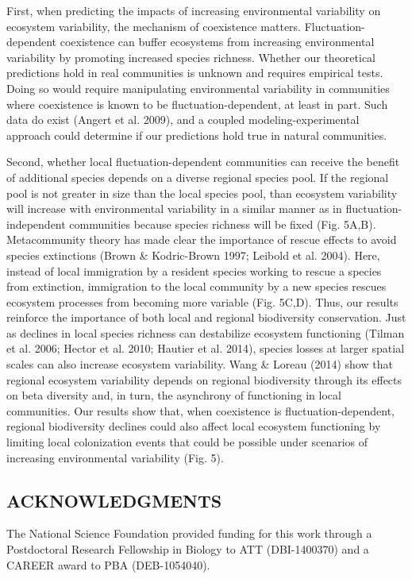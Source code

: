 \documentclass[12pt,]{article}
\begin{document}
First, when predicting the impacts of increasing environmental
variability on ecosystem variability, the mechanism of coexistence
matters. Fluctuation-dependent coexistence can buffer ecosystems from
increasing environmental variability by promoting increased species
richness. Whether our theoretical predictions hold in real communities
is unknown and requires empirical tests. Doing so would require
manipulating environmental variability in communities where coexistence
is known to be fluctuation-dependent, at least in part. Such data do
exist (Angert et al. 2009), and a coupled modeling-experimental approach
could determine if our predictions hold true in natural communities.

Second, whether local fluctuation-dependent communities can receive the
benefit of additional species depends on a diverse regional species
pool. If the regional pool is not greater in size than the local species
pool, than ecosystem variability will increase with environmental
variability in a similar manner as in fluctuation-independent
communities because species richness will be fixed (Fig. 5A,B).
Metacommunity theory has made clear the importance of rescue effects to
avoid species extinctions (Brown \& Kodric-Brown 1997; Leibold et al.
2004). Here, instead of local immigration by a resident species working
to rescue a species from extinction, immigration to the local community
by a new species rescues ecosystem processes from becoming more variable
(Fig. 5C,D). Thus, our results reinforce the importance of both local
and regional biodiversity conservation. Just as declines in local
species richness can destabilize ecosystem functioning (Tilman et al.
2006; Hector et al. 2010; Hautier et al. 2014), species losses at larger
spatial scales can also increase ecosystem variability. Wang \& Loreau
(2014) show that regional ecosystem variability depends on regional
biodiversity through its effects on beta diversity and, in turn, the
asynchrony of functioning in local communities. Our results show that,
when coexistence is fluctuation-dependent, regional biodiversity
declines could also affect local ecosystem functioning by limiting local
colonization events that could be possible under scenarios of increasing
environmental variability (Fig. 5).

\subsection{ACKNOWLEDGMENTS}\label{acknowledgments}

The National Science Foundation provided funding for this work through a
Postdoctoral Research Fellowship in Biology to ATT (DBI-1400370) and a
CAREER award to PBA (DEB-1054040).
\end{document}
